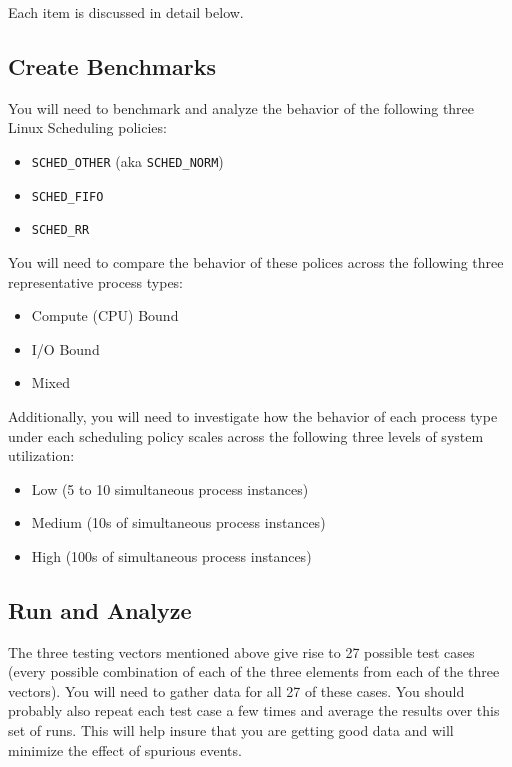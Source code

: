 \documentclass[12pt]{article}
\begin{document}
Each item is discussed in detail below.

\subsection{Create Benchmarks}

You will need to benchmark and analyze the behavior of the following
three Linux Scheduling policies:

\begin{itemize}
\item \texttt{SCHED\_OTHER} (aka \texttt{SCHED\_NORM})
\item \texttt{SCHED\_FIFO}
\item \texttt{SCHED\_RR}
\end{itemize}

You will need to compare the behavior of these polices across the
following three representative process types:

\begin{itemize}
\item Compute (CPU) Bound
\item I/O Bound
\item Mixed
\end{itemize}

Additionally, you will need to investigate how the behavior of each
process type under each scheduling policy scales across the following
three levels of system utilization:

\begin{itemize}
\item Low (5 to 10 simultaneous process instances)
\item Medium (10s of simultaneous process instances)
\item High (100s of simultaneous process instances)
\end{itemize}

\subsection{Run and Analyze}

The three testing vectors mentioned above give rise to 27 possible
test cases (every possible combination of each of the three elements
from each of the three vectors). You will need to gather data for all
27 of these cases. You should probably also repeat each
test case a few times and average the results over this set
of runs. This will help insure that you are getting good data and
will minimize the effect of spurious events.
\end{document}
